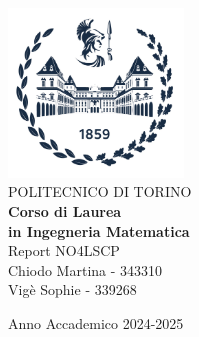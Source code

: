\begin{titlepage}
    
    \begin{center}
    \includegraphics[width=0.35\textwidth]{img/logo_polito_2021.jpg}\\[1cm] 
    {\huge POLITECNICO DI TORINO}\\[1.5cm]
    \textbf{Corso di Laurea\\in Ingegneria Matematica}\\[3cm]
    
     
    {\huge Report NO4LSCP}\\[1cm]
    {\large Chiodo Martina - 343310 \\
    Vigè Sophie - 339268}
    
    
    
    \vfill
    
    Anno Accademico 2024-2025
    \end{center}
    
    \restoregeometry
    
    \end{titlepage}